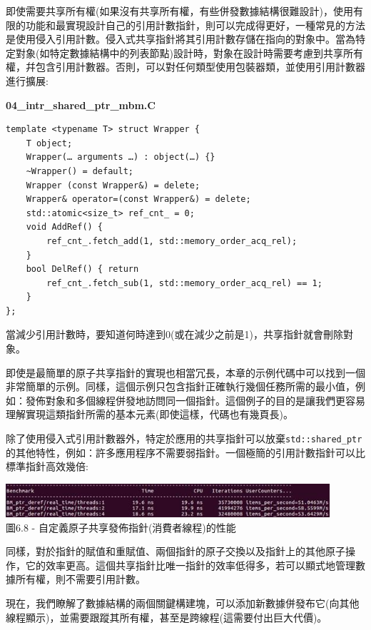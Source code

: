 即使需要共享所有權(如果沒有共享所有權，有些併發數據結構很難設計)，使用有限的功能和最實現設計自己的引用計數指針，則可以完成得更好，一種常見的方法是使用侵入引用計數。侵入式共享指針將其引用計數存儲在指向的對象中。當為特定對象(如特定數據結構中的列表節點)設計時，對象在設計時需要考慮到共享所有權，幷包含引用計數器。否則，可以對任何類型使用包裝器類，並使用引用計數器進行擴展:

\noindent
\textbf{04\_intr\_shared\_ptr\_mbm.C}
\begin{lstlisting}[style=styleCXX]
template <typename T> struct Wrapper {
	T object;
	Wrapper(… arguments …) : object(…) {}
	~Wrapper() = default;
	Wrapper (const Wrapper&) = delete;
	Wrapper& operator=(const Wrapper&) = delete;
	std::atomic<size_t> ref_cnt_ = 0;
	void AddRef() {
		ref_cnt_.fetch_add(1, std::memory_order_acq_rel);
	}
	bool DelRef() { return
		ref_cnt_.fetch_sub(1, std::memory_order_acq_rel) == 1;
	}
};
\end{lstlisting}

當減少引用計數時，要知道何時達到0(或在減少之前是1)，共享指針就會刪除對象。

即使是最簡單的原子共享指針的實現也相當冗長，本章的示例代碼中可以找到一個非常簡單的示例。同樣，這個示例只包含指針正確執行幾個任務所需的最小值，例如：發佈對象和多個線程併發地訪問同一個指針。這個例子的目的是讓我們更容易理解實現這類指針所需的基本元素(即使這樣，代碼也有幾頁長)。

除了使用侵入式引用計數器外，特定於應用的共享指針可以放棄\texttt{std::shared\_ptr}的其他特性，例如：許多應用程序不需要弱指針。一個極簡的引用計數指針可以比標準指針高效幾倍:

\begin{center}
\includegraphics[width=0.9\textwidth]{content/2/chapter6/images/8.jpg}\\
圖6.8 - 自定義原子共享發佈指針(消費者線程)的性能
\end{center}

同樣，對於指針的賦值和重賦值、兩個指針的原子交換以及指針上的其他原子操作，它的效率更高。這個共享指針比唯一指針的效率低得多，若可以顯式地管理數據所有權，則不需要引用計數。

現在，我們瞭解了數據結構的兩個關鍵構建塊，可以添加新數據併發布它(向其他線程顯示)，並需要跟蹤其所有權，甚至是跨線程(這需要付出巨大代價)。




















